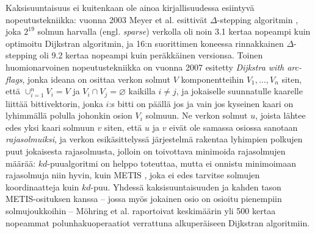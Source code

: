 \documentclass[10pt]{article}
\begin{document}
\noindent Kaksisuuntaisuus ei kuitenkaan ole ainoa kirjallisuudessa esiintyvä nopeutustekniikka: vuonna 2003 Meyer et al. esittivät $\Delta$-stepping algoritmin \cite{Meyer98}, joka $2^{19}$ solmun harvalla (engl. \textit{sparse}) verkolla oli noin 3.1 kertaa nopeampi kuin optimoitu Dijkstran algoritmin, ja 16:n suorittimen koneessa rinnakkainen $\Delta$-stepping oli 9.2 kertaa nopeampi kuin peräkkäinen versionsa. Toinen huomionarvoinen nopeutustekniikka on vuonna 2007 esitetty \textit{Dijkstra with arc-flags}\cite{Mohring07}, jonka ideana on osittaa verkon solmut $V$ komponentteihin $V_1, \dots, V_n$ siten, että $\cup_{i = 1}^n V_i = V$ ja $V_i \cap V_j = \varnothing$ kaikilla $i \neq j$, ja jokaiselle suunnatulle kaarelle liittää bittivektorin, jonka $i$:s bitti on päällä jos ja vain jos kyseinen kaari on lyhimmällä polulla johonkin osion $V_i$ solmuun. Ne verkon solmut $u$, joista lähtee edes yksi kaari solmuun $v$ siten, että $u$ ja $v$ eivät ole samassa osiossa sanotaan \textit{rajasolmuiksi}, ja verkon esikäsittelyssä järjestelmä rakentaa lyhimpien polkujen puut jokaisesta rajasolmusta, jolloin on toivottava minimoida rajasolmujen määrää: $kd$-puualgoritmi on helppo toteuttaa, mutta ei onnistu minimoimaan rajasolmuja niin hyvin, kuin METIS \cite{Karypis98}, joka ei edes tarvitse solmujen koordinaatteja kuin $kd$-puu. Yhdessä kaksisuuntaisuuden ja kahden tason METIS-osituksen kanssa -- jossa myös jokainen osio on osioitu pienempiin solmujoukkoihin -- Möhring et al. raportoivat keskimäärin yli 500 kertaa nopeammat polunhakuoperaatiot verrattuna alkuperäiseen Dijkstran algoritmiin.



\end{document}
